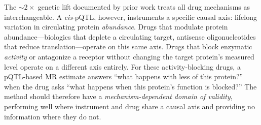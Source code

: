 \documentclass[11pt]{article}
\begin{document}
The ${\sim}2\times$ genetic lift documented by prior work treats all drug mechanisms as interchangeable. A \emph{cis}-pQTL, however, instruments a specific causal axis: lifelong variation in circulating protein \emph{abundance}. Drugs that modulate protein abundance---biologics that deplete a circulating target, antisense oligonucleotides that reduce translation---operate on this same axis. Drugs that block enzymatic \emph{activity} or antagonize a receptor without changing the target protein's measured level operate on a different axis entirely. For these activity-blocking drugs, a pQTL-based MR estimate answers ``what happens with less of this protein?'' when the drug asks ``what happens when this protein's function is blocked?'' The method should therefore have a \emph{mechanism-dependent domain of validity}, performing well where instrument and drug share a causal axis and providing no information where they do not.
\end{document}
